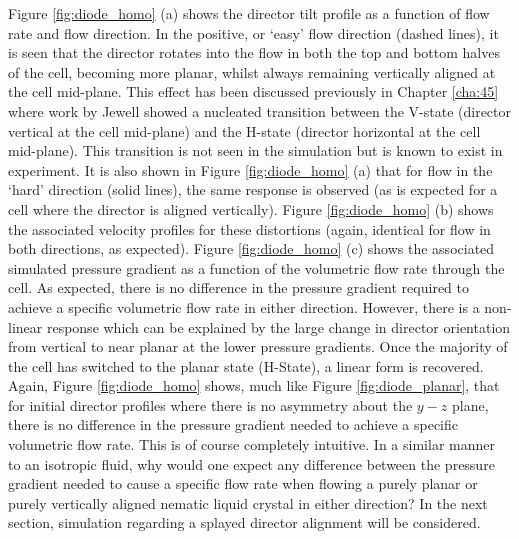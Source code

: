 Figure \ref{fig:diode_homo} (a) shows the director tilt profile as a function of flow rate and flow direction. In the positive, or `easy' flow direction (dashed lines), it is seen that the director rotates into the flow in both the top and bottom halves of the cell, becoming more planar, whilst always remaining vertically aligned at the cell mid-plane. This effect has been discussed previously in Chapter \ref{cha:45} where work by Jewell \cite{Jewell2009} showed a nucleated transition between the V-state (director vertical at the cell mid-plane) and the H-state (director horizontal at the cell mid-plane). This transition is not seen in the simulation but is known to exist in experiment. It is also shown in Figure \ref{fig:diode_homo} (a) that for flow in the `hard' direction (solid lines), the same response is observed (as is expected for a cell where the director is aligned vertically). Figure \ref{fig:diode_homo} (b) shows the associated velocity profiles for these distortions (again, identical for flow in both directions, as expected). Figure \ref{fig:diode_homo} (c) shows the associated simulated pressure gradient as a function of the volumetric flow rate through the cell. As expected, there is no difference in the pressure gradient required to achieve a specific volumetric flow rate in either direction. However, there is a non-linear response which can be explained by the large change in director orientation from vertical to near planar at the lower pressure gradients. Once the majority of the cell has switched to the planar state (H-State), a linear form is recovered. Again, Figure \ref{fig:diode_homo} shows, much like Figure \ref{fig:diode_planar}, that for initial director profiles where there is no asymmetry about the $y-z$ plane, there is no difference in the pressure gradient needed to achieve a specific volumetric flow rate. This is of course completely intuitive. In a similar manner to an isotropic fluid, why would one expect any difference between the pressure gradient needed to cause a specific flow rate when flowing a purely planar or purely vertically aligned nematic liquid crystal in either direction? In the next section, simulation regarding a splayed director alignment will be considered.

